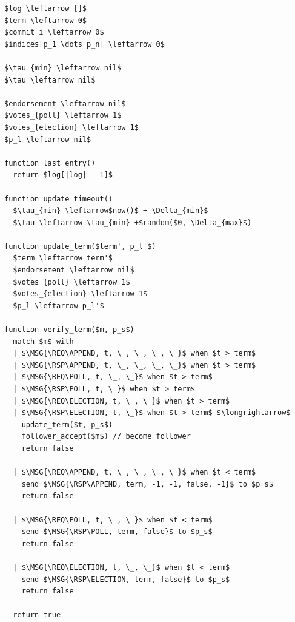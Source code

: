 \documentclass{article}
\begin{document}
	\begin{mdframed}[backgroundcolor=Papyrus]
	\begin{lstlisting}[style=pseudo, caption={Logic shared between follower, candidate and leader states.}]
$log \leftarrow []$
$term \leftarrow 0$
$commit_i \leftarrow 0$
$indices[p_1 \dots p_n] \leftarrow 0$

$\tau_{min} \leftarrow nil$
$\tau \leftarrow nil$

$endorsement \leftarrow nil$
$votes_{poll} \leftarrow 1$
$votes_{election} \leftarrow 1$
$p_l \leftarrow nil$

function last_entry()
  return $log[|log| - 1]$

function update_timeout()
  $\tau_{min} \leftarrow$now()$ + \Delta_{min}$
  $\tau \leftarrow \tau_{min} +$random($0, \Delta_{max}$)

function update_term($term', p_l'$)
  $term \leftarrow term'$
  $endorsement \leftarrow nil$
  $votes_{poll} \leftarrow 1$
  $votes_{election} \leftarrow 1$
  $p_l \leftarrow p_l'$

function verify_term($m, p_s$)
  match $m$ with
  | $\MSG{\REQ\APPEND, t, \_, \_, \_, \_}$ when $t > term$
  | $\MSG{\RSP\APPEND, t, \_, \_, \_, \_}$ when $t > term$
  | $\MSG{\REQ\POLL, t, \_, \_}$ when $t > term$
  | $\MSG{\RSP\POLL, t, \_}$ when $t > term$
  | $\MSG{\REQ\ELECTION, t, \_, \_}$ when $t > term$
  | $\MSG{\RSP\ELECTION, t, \_}$ when $t > term$ $\longrightarrow$
    update_term($t, p_s$)
    follower_accept($m$) // become follower
    return false

  | $\MSG{\REQ\APPEND, t, \_, \_, \_, \_}$ when $t < term$
    send $\MSG{\RSP\APPEND, term, -1, -1, false, -1}$ to $p_s$
    return false

  | $\MSG{\REQ\POLL, t, \_, \_}$ when $t < term$
    send $\MSG{\RSP\POLL, term, false}$ to $p_s$
    return false

  | $\MSG{\REQ\ELECTION, t, \_, \_}$ when $t < term$
    send $\MSG{\RSP\ELECTION, term, false}$ to $p_s$
    return false

  return true
	\end{lstlisting}
	\end{mdframed}
\end{document}
